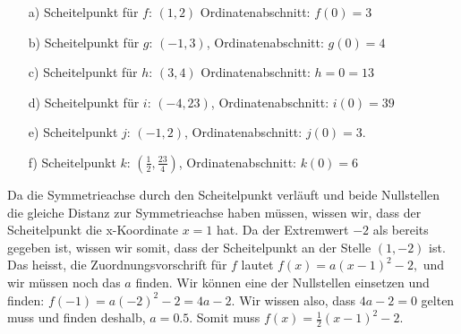 \documentclass[12pt]{article}
\begin{document}
\begin{solution}
\begin{enumerate}
\item[a)] Scheitelpunkt für $f$: $(1, 2)$ Ordinatenabschnitt: $f(0)= 3$
\item[b)] Scheitelpunkt für $g$: $(-1,3)$, Ordinatenabschnitt: $g(0)= 4$
%
\item[c)] Scheitelpunkt für $h$: $(3,4)$ Ordinatenabschnitt: $h=0 = 13$
\item[d)] Scheitelpunkt für $i$: $(-4,23)$, Ordinatenabschnitt: $i(0)=39$
\item[e)] Scheitelpunkt $j$: $(-1,2)$, Ordinatenabschnitt: $j(0)=3.$ 
\item[f)] Scheitelpunkt $k$: $(\frac{1}{2},\frac{23}{4})$, Ordinatenabschnitt: $k(0) = 6$
\end{enumerate}
\end{solution}

\begin{solution}
Da die Symmetrieachse durch den Scheitelpunkt verläuft und beide Nullstellen die gleiche Distanz zur Symmetrieachse haben müssen, wissen wir, dass der Scheitelpunkt die x-Koordinate $x=1$ hat.
Da der Extremwert $-2$ als bereits gegeben ist, wissen wir somit, dass der Scheitelpunkt an der Stelle $(1,-2)$ ist.
Das heisst, die Zuordnungsvorschrift für $f$ lautet $f(x) = a(x-1)^2 -2,$ und wir müssen noch das $a$ finden.
Wir können eine der Nullstellen einsetzen und finden: $f(-1) = a(-2)^2 -2 = 4a - 2.$
Wir wissen also, dass $4a-2 = 0$ gelten muss und finden deshalb, $a=0.5$.
Somit muss $f(x)=\frac{1}{2}(x-1)^{2}-2$.
\end{solution}
\end{document}
